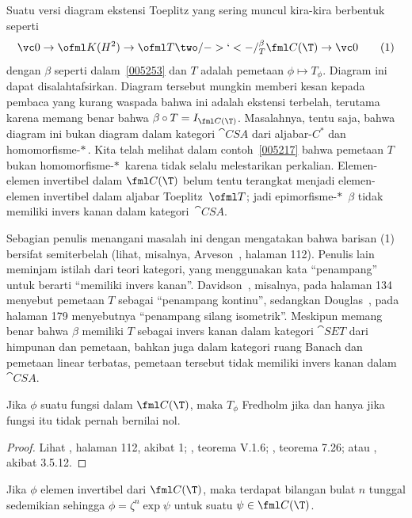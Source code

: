\begin{rem} Suatu versi diagram ekstensi Toeplitz yang sering muncul kira-kira berbentuk
seperti
     \[ \vc 0 \to \ofml K(H^2) \to \ofml T \two/->`<-/^\beta_T \fml C(\T) \to \vc 0 \tag{1} \]
dengan $\beta$ seperti dalam~\ref{005253} dan $T$ adalah pemetaan $\phi \mapsto T_\phi$. Diagram ini
dapat disalahtafsirkan. Diagram tersebut mungkin memberi kesan kepada pembaca yang kurang waspada bahwa ini adalah ekstensi
terbelah, terutama karena memang benar bahwa $\beta \circ T = I_{\fml
C(\T)}$. Masalahnya, tentu saja, bahwa diagram ini bukan diagram dalam kategori
$\cat{CSA}$ dari aljabar-$C^*$ dan homomorfisme-$*\,$. Kita telah melihat dalam
contoh~\ref{005217} bahwa pemetaan $T$ bukan homomorfisme-$*\,$ karena tidak
selalu melestarikan perkalian. Elemen-elemen invertibel dalam $\fml C(\T)$ belum tentu terangkat menjadi
elemen-elemen invertibel dalam aljabar Toeplitz~$\ofml T$; jadi epimorfisme-$*\,$ $\beta$
tidak memiliki invers kanan dalam kategori~$\cat{CSA}$.

Sebagian penulis menangani masalah ini dengan mengatakan bahwa barisan (1) bersifat semiterbelah (lihat, misalnya,
Arveson~\cite{Arveson:2002}, halaman 112). Penulis lain meminjam istilah dari teori kategori,
yang menggunakan kata ``penampang'' untuk berarti ``memiliki invers kanan''.
Davidson~\cite{Davidson:1996}, misalnya, pada halaman 134 menyebut pemetaan $T$ sebagai
``penampang kontinu'', sedangkan Douglas~\cite{Douglas:1972}, pada halaman 179 menyebutnya
``penampang silang isometrik''. Meskipun memang benar bahwa $\beta$ memiliki $T$ sebagai invers
kanan dalam kategori $\cat{SET}$ dari himpunan dan pemetaan, bahkan juga dalam kategori ruang Banach
dan pemetaan linear terbatas, pemetaan tersebut tidak memiliki invers kanan dalam $\cat{CSA}$.
\end{rem}

\begin{prop} Jika $\phi$ suatu fungsi dalam $\fml C(\T)$, maka $T_\phi$ Fredholm jika dan hanya jika
fungsi itu tidak pernah bernilai nol.
\end{prop}

\begin{proof} Lihat \cite{Arveson:2002}, halaman 112, akibat 1; \cite{Davidson:1996}, teorema
V.1.6; \cite{Douglas:1972}, teorema 7.26; atau \cite{Murphy:1990}, akibat 3.5.12. \ns
\end{proof}

\begin{prop}\label{005271} Jika $\phi$ elemen invertibel dari $\fml C(\T)$, maka terdapat
bilangan bulat $n$ tunggal sedemikian sehingga $\phi = \zeta^n \exp \psi$ untuk suatu $\psi \in \fml
C(\T)$.
\end{prop}


